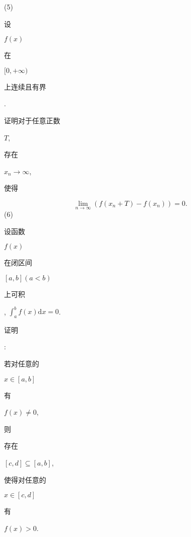 \documentclass[10pt]{article}
\begin{document}
(5) \begin{CJK}{UTF8}{mj}设\end{CJK} $f(x)$ \begin{CJK}{UTF8}{mj}在\end{CJK} $[0,+\infty)$ \begin{CJK}{UTF8}{mj}上连续且有界\end{CJK}. \begin{CJK}{UTF8}{mj}证明对于任意正数\end{CJK} $T$, \begin{CJK}{UTF8}{mj}存在\end{CJK} $x_{n} \rightarrow \infty$, \begin{CJK}{UTF8}{mj}使得\end{CJK}
$$
\lim _{n \rightarrow \infty}\left(f\left(x_{n}+T\right)-f\left(x_{n}\right)\right)=0 .
$$
(6) \begin{CJK}{UTF8}{mj}设函数\end{CJK} $f(x)$ \begin{CJK}{UTF8}{mj}在闭区间\end{CJK} $[a, b](a<b)$ \begin{CJK}{UTF8}{mj}上可积\end{CJK}, $\int_{a}^{b} f(x) \mathrm{d} x=0$. \begin{CJK}{UTF8}{mj}证明\end{CJK}: \begin{CJK}{UTF8}{mj}若对任意的\end{CJK} $x \in[a, b]$ \begin{CJK}{UTF8}{mj}有\end{CJK} $f(x) \neq 0$, \begin{CJK}{UTF8}{mj}则\end{CJK} \begin{CJK}{UTF8}{mj}存在\end{CJK} $[c, d] \subseteq[a, b]$, \begin{CJK}{UTF8}{mj}使得对任意的\end{CJK} $x \in[c, d]$ \begin{CJK}{UTF8}{mj}有\end{CJK} $f(x)>0$.
\end{document}

